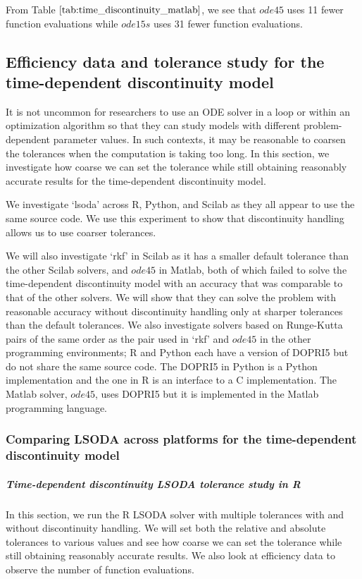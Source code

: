From Table $\ref{tab:time_discontinuity_matlab}$, we see that $ode45$ uses 11 fewer function evaluations while $ode15s$ uses 31 fewer function evaluations.

\subsection{Efficiency data and tolerance study 
for the time-dependent discontinuity model}
\label{subsection:time_tolerance_study}
It is not uncommon for researchers to use an ODE solver in a loop or within an optimization algorithm so that they can study models with different problem-dependent parameter values. In such contexts, it may be reasonable to coarsen the tolerances when the computation is taking too long. In this section, we investigate how coarse we can set the tolerance while still obtaining reasonably accurate results for the time-dependent discontinuity model. 

We investigate `lsoda' across R, Python, and Scilab as they all appear to use the same source code. We use this experiment to show that discontinuity handling allows us to use coarser tolerances.

We will also investigate `rkf' in Scilab as it has a smaller default tolerance than the other Scilab solvers, and $ode45$ in Matlab, both of which failed to solve the time-dependent discontinuity model with an accuracy that was comparable to that of the other solvers. We will show that they can solve the problem with reasonable accuracy without discontinuity handling only at sharper tolerances than the default tolerances. We also investigate solvers based on Runge-Kutta pairs of the same order as the pair used in `rkf' and $ode45$ in the other programming environments; R and Python each have a version of DOPRI5 but do not share the same source code. The DOPRI5 in Python is a Python implementation and the one in R is an interface to a C implementation. The Matlab solver, $ode45$, uses DOPRI5 but it is implemented in the Matlab programming language.

\subsubsection{Comparing LSODA across platforms for the time-dependent discontinuity model}
\subparagraph{Time-dependent discontinuity LSODA tolerance study in R}
In this section, we run the R LSODA solver with multiple tolerances with and without discontinuity handling. We will set both the relative and absolute tolerances to various values and see how coarse we can set the tolerance while still obtaining reasonably accurate results. We also look at efficiency data to observe the number of function evaluations.


